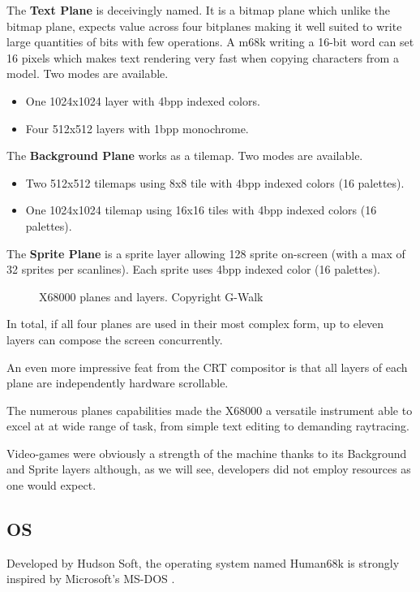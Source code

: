The \textbf{Text Plane} is deceivingly named. It is a bitmap plane which unlike the bitmap plane, expects value across four bitplanes making it well suited to write large quantities of bits with few operations. A m68k writing a 16-bit word can set 16 pixels which makes text rendering very fast when copying characters from a model. Two modes are available.

\begin{itemize}[topsep=0pt]
\item One 1024x1024 layer with 4bpp indexed colors.
\item Four 512x512 layers with 1bpp monochrome.
\end{itemize}


The \textbf{Background Plane} works as a tilemap. Two modes are available.
\begin{itemize}[topsep=0pt]
\item Two 512x512 tilemaps using 8x8 tile with 4bpp indexed colors (16 palettes).
\item One 1024x1024 tilemap using 16x16 tiles with 4bpp indexed colors (16 palettes).
\end{itemize}

The \textbf{Sprite Plane} is a sprite layer allowing 128 sprite on-screen (with a max of 32 sprites per scanlines). Each sprite uses 4bpp indexed color (16 palettes).


 \begin{figure}[H]
\caption*{X68000 planes and layers. Copyright G-Walk\cite{x68k_perfect_catalogue}}
\end{figure}



In total, if all four planes are used in their most complex form, up to eleven layers can compose the screen concurrently. 

An even more impressive feat from the CRT compositor is that all layers of each plane are independently hardware scrollable.

The numerous planes capabilities made the X68000 a versatile instrument able to excel at at wide range of task, from simple text editing to demanding raytracing. 

Video-games were obviously a strength of the machine thanks to its Background and Sprite layers although, as we will see, developers did not employ resources as one would expect.



\subsection{OS}
Developed by Hudson Soft, the operating system named Human68k is strongly inspired by Microsoft's MS-DOS . 

